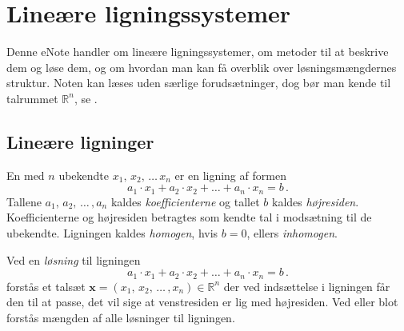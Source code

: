  
\setcounter{chapter}{1} %


\chapter{Lineære ligningssystemer} \label{tn2}

\begin{basis}
Denne eNote handler om lineære ligningssystemer, om metoder til at beskrive dem og løse dem, og om hvordan man kan få overblik over løsningsmængdernes struktur. Noten kan læses uden særlige forudsætninger, dog bør man kende til talrummet $\mathbb R^n$, se .
\end{basis}

\section{Lineære ligninger}

En  med $n$ ubekendte $x_1,\,x_2,\,\ldots\,x_n$ er en ligning af formen
\begin{equation}\label{TN2.1}
a_1\cdot x_1+a_2\cdot x_2+\ldots+a_n\cdot x_n=b\,.
\end{equation}
Tallene $a_1,\,a_2,\,\ldots\,,a_n$ kaldes \textit{koefficienterne} og tallet $b$ kaldes \textit{højresiden}. Koefficienterne og højresiden betragtes som kendte tal i modsætning til de ubekendte. Ligningen kaldes \textit{homogen}, hvis $b=0$, ellers \textit{inhomogen}.

\begin{definition}
Ved en \textit{løsning} til ligningen 
\begin{equation}\label{TN2.1b}
a_1\cdot x_1+a_2\cdot x_2+\ldots+a_n\cdot x_n=b\,.
\end{equation}
forstås et talsæt $\mathbf{x}=(x_1,\,x_2,\,\ldots\,,x_n) \in \mathbb R^n$ der ved indsættelse i ligningen får den til at passe, det vil sige at venstresiden er lig med højresiden. \bs
Ved  eller blot  forstås mængden af alle løsninger til ligningen.
\end{definition}


